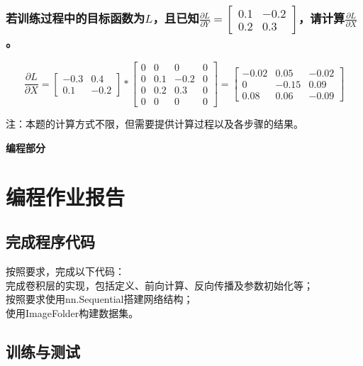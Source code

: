 \documentclass[a4paper]{article}
\begin{document}
\subsubsection{若训练过程中的目标函数为$L$，且已知$\frac{\partial L}{\partial Y}=\left[ \begin{array}{cc}
    0.1 & -0.2 \\
    0.2 & 0.3
\end{array} \right]$，请计算$\frac{\partial L}{\partial X}$。
}
$$
\frac{\partial L}{\partial X} = 
\left[ \begin{array}{cc}
    -0.3 & 0.4 \\
    0.1 & -0.2
\end{array} \right] * 
\left[ \begin{array}{cccc}
    0 & 0 & 0 & 0 \\
    0 & 0.1 & -0.2 & 0 \\
    0 & 0.2 & 0.3 & 0 \\
    0 & 0 & 0 & 0
\end{array} \right] = 
\left[ \begin{array}{ccc}
    -0.02 & 0.05 & -0.02 \\
    0 & -0.15 & 0.09 \\
    0.08 & 0.06 & -0.09
\end{array} \right]
$$

注：本题的计算方式不限，但需要提供计算过程以及各步骤的结果。
\vspace{6mm}
\centerline{\textbf{\Large{编程部分}}}
\vspace{3mm}

\section{编程作业报告}
\subsection{完成程序代码}
按照要求，完成以下代码：\\
完成卷积层的实现，包括定义、前向计算、反向传播及参数初始化等；\\
按照要求使用nn.Sequential搭建网络结构；\\
使用ImageFolder构建数据集。\\

\subsection{训练与测试}
\end{document}
